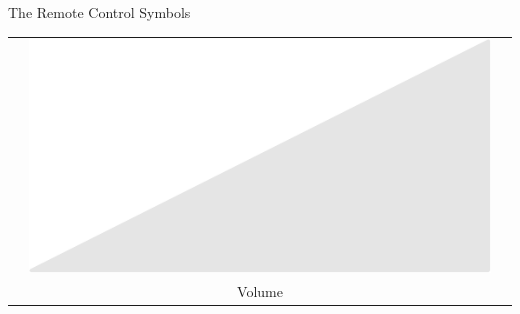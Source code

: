 \documentclass[14pt]{beamer}
\begin{document}
\begin{frame}{The Remote Control Symbols}
\begin{center}
\begin{tabular}{ccc}
                &\quad\includegraphics[scale=0.2]{figures/figure026l.pdf} \quad& \\
                &\quad Volume \quad& \\
            \end{tabular}
        \end{center}
    \end{frame}

\end{document}

